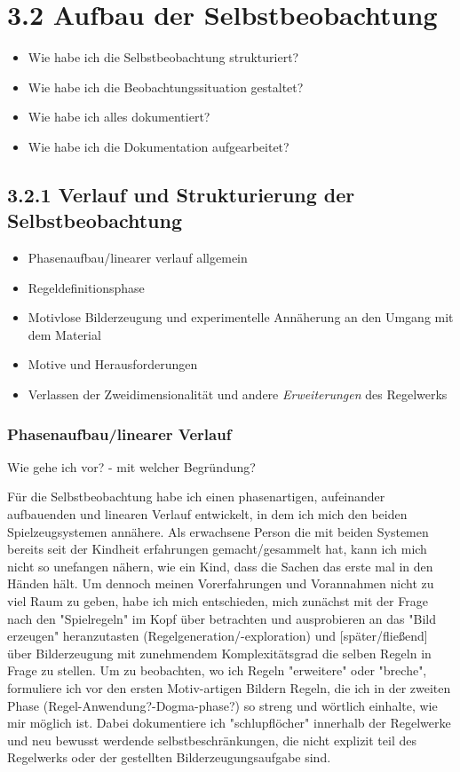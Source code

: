 \documentclass[11pt,a4paper,twoside]{scrreprt}
\begin{document}
	\section{3.2 Aufbau der Selbstbeobachtung}
	\begin{itemize}
		\item Wie habe ich die Selbstbeobachtung strukturiert?
		\item Wie habe ich die Beobachtungssituation gestaltet?
		\item Wie habe ich alles dokumentiert?
		\item Wie habe ich die Dokumentation aufgearbeitet?
	\end{itemize}

		\subsection{3.2.1 Verlauf und Strukturierung der Selbstbeobachtung}
		\begin{itemize}
			\item Phasenaufbau/linearer verlauf allgemein 
			\item Regeldefinitionsphase
			\item Motivlose Bilderzeugung und experimentelle Annäherung an den Umgang mit dem Material
			\item Motive und Herausforderungen 
			\item Verlassen der Zweidimensionalität und andere \textit{Erweiterungen} des Regelwerks
		\end{itemize}

				\subsubsection{Phasenaufbau/linearer Verlauf}

Wie gehe ich vor? - mit welcher Begründung?

Für die Selbstbeobachtung habe ich einen phasenartigen, aufeinander aufbauenden und linearen Verlauf entwickelt, in dem ich mich den beiden Spielzeugsystemen annähere.
Als erwachsene Person die mit beiden Systemen bereits seit der Kindheit erfahrungen gemacht/gesammelt hat, kann ich mich nicht so unefangen nähern, wie ein Kind, dass die Sachen das erste mal in den Händen hält.
Um dennoch meinen Vorerfahrungen und Vorannahmen nicht zu viel Raum zu geben, habe ich mich entschieden, mich zunächst mit der Frage nach den "Spielregeln" im Kopf über betrachten und ausprobieren an das "Bild erzeugen" heranzutasten (Regelgeneration/-exploration) und [später/fließend] über Bilderzeugung mit zunehmendem Komplexitätsgrad die selben Regeln in Frage zu stellen. 
Um zu beobachten, wo ich Regeln "erweitere" oder "breche", formuliere ich vor den ersten Motiv-artigen Bildern Regeln, die ich in der zweiten Phase (Regel-Anwendung?-Dogma-phase?) so streng und wörtlich einhalte, wie mir möglich ist. Dabei dokumentiere ich "schlupflöcher" innerhalb der Regelwerke und neu bewusst werdende selbstbeschränkungen, die nicht explizit teil des Regelwerks oder der gestellten Bilderzeugungsaufgabe sind. 
\end{document}
